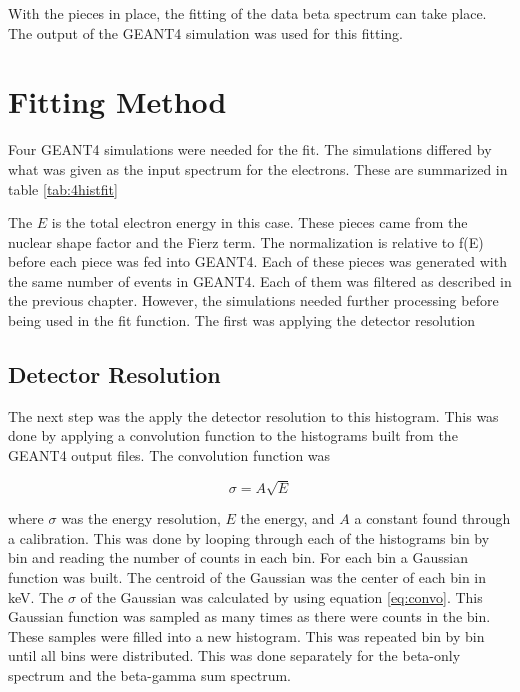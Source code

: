 \documentclass[main.tex]{subfiles}
\begin{document}
With the pieces in place, the fitting of the data beta spectrum can take place.
The output of the GEANT4 simulation was used for this fitting.  

\section{Fitting Method}
Four GEANT4 simulations were needed for the fit.
The simulations differed by what was given as the input spectrum for the electrons.
These are summarized in table \ref{tab:4histfit}

\begin{table}[!hbt]
	\centering
	\caption{The four histograms used for the fit}
		\label{tab:4histfit}
\end{table}

The $E$ is the total electron energy in this case.
These pieces came from the nuclear shape factor and the Fierz term. 
The normalization is relative to f(E) before each piece was fed into GEANT4. 
Each of these pieces was generated with the same number of events in GEANT4.
Each of them was filtered as described in the previous chapter.
However, the simulations needed further processing before being used in the fit function. 
The first was applying the detector resolution

\subsection{Detector Resolution}
\label{sec:convolution}
The next step was the apply the detector resolution to this histogram.
This was done by applying a convolution function to the histograms built from the GEANT4 output files.
The convolution function was

\begin{equation}
	\sigma = A\sqrt{E}
	\label{eq:convo}
\end{equation}

where $\sigma$ was the energy resolution, $E$ the energy, and $A$ a constant found through a calibration.
This was done by looping through each of the histograms bin by bin and reading the number of counts in each bin.
For each bin a Gaussian function was built.
The centroid of the Gaussian was the center of each bin in keV.
The $\sigma$ of the Gaussian was calculated by using equation \ref{eq:convo}.
This Gaussian function was sampled as many times as there were counts in the bin.
These samples were filled into a new histogram.
This was repeated bin by bin until all bins were distributed.
This was done separately for the beta-only spectrum and the beta-gamma sum spectrum. 
\end{document}
